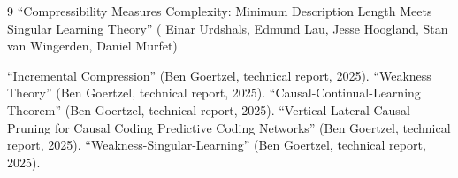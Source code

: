 \documentclass[11pt]{article}
\begin{document}

\begin{thebibliography}{9}
``Compressibility Measures Complexity: Minimum Description Length Meets Singular Learning Theory''
( Einar Urdshals, Edmund Lau, Jesse Hoogland, Stan van Wingerden, Daniel Murfet)

``Incremental Compression'' (Ben Goertzel, technical report, 2025).
``Weakness Theory'' (Ben Goertzel, technical report, 2025).
``Causal-Continual-Learning Theorem'' (Ben Goertzel, technical report, 2025).
``Vertical-Lateral Causal Pruning for Causal Coding Predictive Coding Networks'' (Ben Goertzel, technical report, 2025).
``Weakness-Singular-Learning'' (Ben Goertzel, technical report, 2025).
\end{thebibliography}
\end{document}
